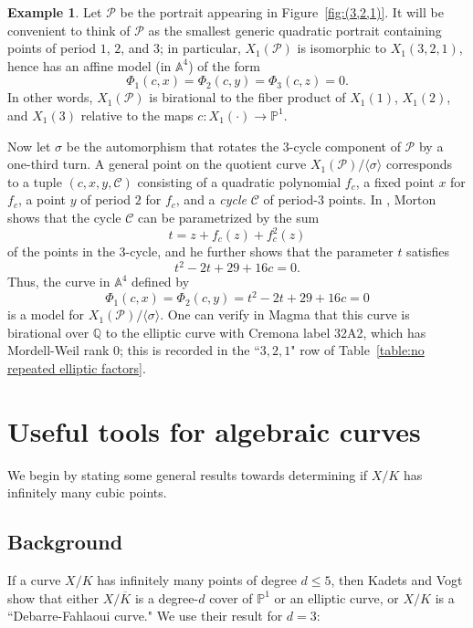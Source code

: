 \documentclass[12pt]{amsart}
\theoremstyle{definition}
\newtheorem{ex}[thm]{Example}
\newcommand{\bbA}{\mathbb{A}}
\newcommand{\bbP}{\mathbb{P}}
\newcommand{\bbQ}{\mathbb{Q}}
\newcommand{\calC}{\mathcal{C}}
\newcommand{\calP}{\mathcal{P}}
\numberwithin{equation}{section}
\begin{document}
\begin{ex}
Let $\calP$ be the portrait appearing in Figure~\ref{fig:(3,2,1)}. It will be convenient to think of $\calP$ as the smallest generic quadratic portrait containing points of period $1$, $2$, and $3$; in particular, $X_1(\calP)$ is isomorphic to $X_1(3,2,1)$, hence has an affine model (in $\bbA^4$) of the form
    \[
    \Phi_1(c,x) = \Phi_2(c,y) = \Phi_3(c,z) = 0.
    \]
In other words, $X_1(\calP)$ is birational to the fiber product of $X_1(1)$, $X_1(2)$, and $X_1(3)$ relative to the maps $c : X_1(\cdot) \to \bbP^1$.

Now let $\sigma$ be the automorphism that rotates the $3$-cycle component of $\calP$ by a one-third turn. A general point on the quotient curve $X_1(\calP) / \langle \sigma\rangle$ corresponds to a tuple $(c, x, y, \calC)$ consisting of a quadratic polynomial $f_c$, a fixed point $x$ for $f_c$, a point $y$ of period $2$ for $f_c$, and a {\it cycle} $\calC$ of period-$3$ points. In \cite{morton:1992}, Morton shows that the cycle $\calC$ can be parametrized by the sum
    \[
    t = z + f_c(z) + f_c^2(z)
    \]
of the points in the $3$-cycle, and he further shows that the parameter $t$ satisfies
    \[
        t^2 - 2t + 29 + 16c = 0.
    \]
Thus, the curve in $\bbA^4$ defined by
    \[
        \Phi_1(c,x) = \Phi_2(c,y) = t^2 - 2t + 29 + 16c = 0
    \]
is a model for $X_1(\calP) / \langle\sigma\rangle$. One can verify in Magma that this curve is birational over $\bbQ$ to the elliptic curve with Cremona label 32A2, which has Mordell-Weil rank $0$; this is recorded in the ``$3, 2, 1$" row of Table~\ref{table:no repeated elliptic factors}.
\end{ex}

\section{Useful tools for algebraic curves}\label{sec:useful-tools}

We begin by stating some general results towards determining if $X/K$ has infinitely many cubic points.

\subsection{Background}

If a curve $X/K$ has infinitely many points of degree $d \leq 5$, then Kadets and Vogt \cite{kadets/vogt:2025} show that either $X/\overline{K}$ is a degree-$d$ cover of $\mathbb{P}^1$ or an elliptic curve, or $X/K$ is a ``Debarre-Fahlaoui curve." We use their result for $d=3$:
\end{document}
